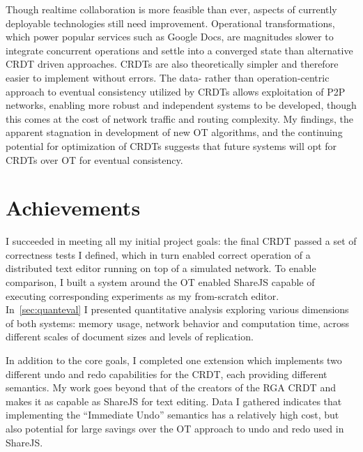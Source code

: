 \documentclass[12pt,a4paper,twoside,openright]{report}
\begin{document}
Though realtime collaboration is more feasible than ever, aspects of currently deployable technologies still need improvement. Operational transformations, which power popular services such as Google Docs, are magnitudes slower to integrate concurrent operations and settle into a converged state than alternative CRDT driven approaches. CRDTs are also theoretically simpler and therefore easier to implement without errors. The data- rather than operation-centric approach to eventual consistency utilized by CRDTs allows exploitation of P2P networks, enabling more robust and independent systems to be developed, though this comes at the cost of network traffic and routing complexity. My findings, the apparent stagnation in development of new OT algorithms, and the continuing potential for optimization of CRDTs suggests that future systems will opt for CRDTs over OT for eventual consistency.


\section{Achievements}

I succeeded in meeting all my initial project goals: the final CRDT passed a set of correctness tests I defined, which in turn enabled correct operation of a distributed text editor running on top of a simulated network. To enable comparison, I built a system around the OT enabled ShareJS capable of executing corresponding experiments as my from-scratch editor. In~\cref{sec:quanteval} I presented quantitative analysis exploring various dimensions of both systems: memory usage, network behavior and computation time, across different scales of document sizes and levels of replication. 

In addition to the core goals, I completed one extension which implements two different undo and redo capabilities for the CRDT, each providing different semantics. My work goes beyond that of the creators of the RGA CRDT and makes it as capable as ShareJS for text editing. Data I gathered indicates that implementing the ``Immediate Undo'' semantics has a relatively high cost, but also potential for large savings over the OT approach to undo and redo used in ShareJS.
\end{document}
